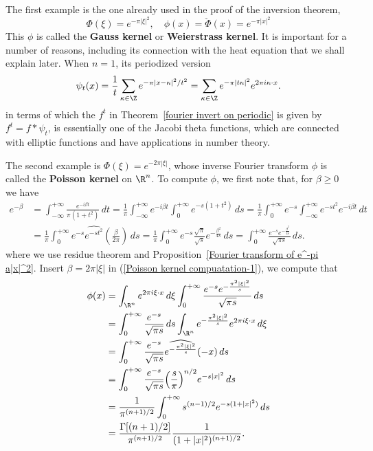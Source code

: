 \begin{example}
The first example is the one already used in the proof of the inversion theorem,
\[\Phi(\xi)=e^{-\pi|\xi|^2},\quad \phi(x)=\check{\Phi}(x)=e^{-\pi|x|^2}\]
This $\phi$ is called the \textbf{Gauss kernel} or \textbf{Weierstrass kernel}. It is important for a number of reasons, including its connection with the heat equation that we shall explain later. When $n=1$, its periodized version
\[\psi_t(x)=\frac{1}{t}\sum_{\kappa\in\Z}e^{-\pi|x-\kappa|^2/t^2}=\sum_{\kappa\in\Z}e^{-\pi|t\kappa|^2}e^{2\pi i\kappa\cdot x}.\]
in terms of which the $f^t$ in Theorem~\ref{fourier invert on periodic} is given by $f^t=f\ast\psi_t$, is essentially one of the Jacobi theta functions, which are connected with elliptic functions and have applications in number theory.
\end{example}
\begin{example}
The second example is $\Phi(\xi)=e^{-2\pi|\xi|}$, whose inverse Fourier transform $\phi$ is called the \textbf{Poisson kernel} on $\R^n$. To compute $\phi$, we first note that, for $\beta\geq 0$ we have
\begin{equation}\label{Poisson kernel compuatation-1}
\begin{aligned}
e^{-\beta}&=\int_{-\infty}^{+\infty}\frac{e^{-i\beta t}}{\pi(1+t^2)}\,dt=\frac{1}{\pi}\int_{-\infty}^{+\infty}e^{-i\beta t}\int_{0}^{+\infty}e^{-s(1+t^2)}\,ds=\frac{1}{\pi}\int_{0}^{+\infty}e^{-s}\int_{-\infty}^{+\infty}e^{-st^2}e^{-i\beta t}\,dt\\
&=\frac{1}{\pi}\int_{0}^{+\infty}e^{-s}\widehat{e^{-st^2}}(\frac{\beta}{2\pi})\,ds=\frac{1}{\pi}\int_{0}^{+\infty}e^{-s}\frac{\sqrt{\pi}}{\sqrt{s}}e^{-\frac{\beta^2}{4s}}\,ds=\int_{0}^{+\infty}\frac{e^{-s}e^{-\frac{\beta^2}{4s}}}{\sqrt{\pi s}}\,ds.
\end{aligned}
\end{equation}
where we use residue theorem and Proposition~\ref{Fourier transform of e^-pi a|x|^2}. Insert $\beta=2\pi|\xi|$ in (\ref{Poisson kernel compuatation-1}), we compute that
\begin{align*}
\phi(x)&=\int_{\R^n}e^{2\pi i\xi\cdot x}\,d\xi\int_{0}^{+\infty}\frac{e^{-s}e^{-\frac{\pi^2|\xi|^2}{s}}}{\sqrt{\pi s}}\,ds\\
&=\int_{0}^{+\infty}\frac{e^{-s}}{\sqrt{\pi s}}\,ds\int_{\R^n}e^{-\frac{\pi^2|\xi|^2}{s}}e^{2\pi i\xi\cdot x}\,d\xi\\
&=\int_{0}^{+\infty}\frac{e^{-s}}{\sqrt{\pi s}}\widehat{e^{-\frac{\pi^2|\xi|^2}{s}}}(-x)\,ds\\
&=\int_{0}^{+\infty}\frac{e^{-s}}{\sqrt{\pi s}}\Big(\frac{s}{\pi}\Big)^{n/2}e^{-s|x|^2}\,ds\\
&=\frac{1}{\pi^{(n+1)/2}}\int_{0}^{+\infty}s^{(n-1)/2}e^{-s(1+|x|^2)}\,ds\\
&=\frac{\Gamma[(n+1)/2]}{\pi^{(n+1)/2}}\frac{1}{(1+|x|^2)^{(n+1)/2}}.
\end{align*}


\end{example}
